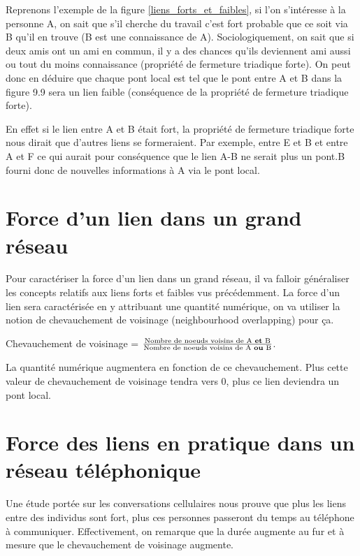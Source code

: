 Reprenons l'exemple de la figure \ref{liens_forts_et_faibles}, si l'on s'intéresse à la personne
A, on sait que s'il cherche du travail c'est fort probable que ce soit
via B qu'il en trouve (B est une connaissance de A). Sociologiquement, on sait que si deux amis ont un ami en commun, il y a des chances qu'ils deviennent ami aussi ou tout du moins connaissance (propriété de fermeture triadique forte). On peut donc en déduire que chaque pont local est tel que le pont entre A et B dans la figure 9.9 sera un lien faible (conséquence de la propriété de fermeture triadique forte).

En effet si le lien entre A et B était fort, la propriété de fermeture triadique forte nous dirait que d'autres liens se formeraient. Par exemple, entre E et B et entre A et F ce qui aurait pour conséquence que le lien A-B ne serait plus un pont.B fourni donc de nouvelles informations à A via le pont local.

\section{Force d'un lien dans un grand réseau}
Pour caractériser la force d'un lien dans un grand réseau, il va falloir généraliser les concepts relatifs aux liens forts et faibles vus précédemment.
La force d'un lien sera caractérisée en y attribuant une quantité numérique, on va utiliser la notion de chevauchement de voisinage (neighbourhood overlapping) pour ça.
\begin{center}
Chevauchement de voisinage = $\frac{\text{Nombre de noeuds voisins de A \textbf{et} B}}{\text{Nombre de noeuds voisins de A \textbf{ou} B}}$.\\
\end{center}
La quantité numérique augmentera en fonction de ce chevauchement. Plus cette valeur de chevauchement de voisinage tendra vers 0, plus ce lien deviendra un pont local.
\newline
\section{Force des liens en pratique dans un réseau téléphonique}
Une étude portée sur les conversations cellulaires nous prouve que plus les liens entre des individus sont fort, plus ces personnes passeront du temps au téléphone à communiquer. Effectivement, on remarque que la durée augmente au fur et à mesure que le chevauchement de voisinage augmente.
\newline

